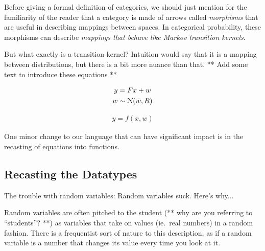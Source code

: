 Before giving a formal definition of categories, we should just mention for the familiarity of the reader that a category is made of arrows called \emph{morphisms} that are useful in describing mappings between spaces. In categorical probability, these morphisms can describe \emph{mappings that behave like Markov transition kernels}.

But what exactly is a transition kernel?
Intuition would say that it is a mapping between distributions, but there is a bit more nuance than that. ** Add some text to introduce these equations **

\newcommand{\reals}{\mathds{R}}
\begin{equation}
\label{traditional-gaussian-model}
\begin{gathered}
    y = Fx + w \\
    w \sim \mathcal{N}(\bar{w}, R)
\end{gathered}
\end{equation}

\begin{equation}
    \begin{aligned}
	y = f(x,w)
    \end{aligned}
\end{equation}


One minor change to our language that can have significant impact is in the recasting of equations into functions.

\subsection{Recasting the Datatypes}
The trouble with random variables:
Random variables suck. Here's why...

Random variables are often pitched to the student (** why are you referring to ``students''? **) as variables that take on values (ie.\ real numbers) in a random fashion.
There is a frequentist sort of nature to this description, as if a random variable is a number that changes its value every time you look at it.

